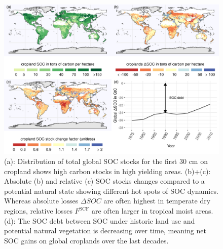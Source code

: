 \documentclass[gc, manuscript]{copernicus}
\begin{document}
\begin{figure}[h]
\includegraphics[width=18cm]{../ResultNotebooks/Output/Images/4panelfigure} \caption{(a): Distribution of total global SOC stocks for the first 30 cm on cropland shows high carbon stocks in high yielding areas. (b)+(c): Absolute (b) and relative (c) SOC stocks changes compared to a potential natural state showing different hot spots of SOC dynamics. Whereas absolute losses $\Delta SOC$ are often highest in temperate dry regions, relative losses $F^\mathrm{SCF}$ are often larger in tropical moist areas. (d): The SOC debt between SOC under historic land use and potential natural vegetation is decreasing over time, meaning net SOC gains on global croplands over the last decades. }\label{fig:SOCmaps}
\end{figure}
\end{document}
